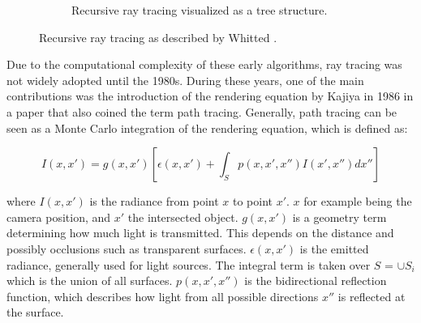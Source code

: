 \begin{figure}[H]
\begin{subfigure}[t]{0.45\textwidth}
    \caption{Recursive ray tracing visualized as a tree structure.}
    \label{fig:recursiveTree}
  \end{subfigure}
  \caption{Recursive ray tracing as described by Whitted \cite{whittedGlobalIllumination}.}
  \label{fig:recursiveRayTracing}
\end{figure}

Due to the computational complexity of these early algorithms, ray tracing was not widely adopted until the 1980s. During these years, one of the main contributions was the introduction of the rendering equation by Kajiya in 1986 in a paper that also coined the term path tracing. Generally, path tracing can be seen as a Monte Carlo integration of the rendering equation, which is defined as:

\begin{equation}
  \label{eqn:rendering-equation}
  I(x, x') = g(x, x') [\epsilon(x, x') + \int_{S} p(x, x', x'')I(x', x'')dx'']
\end{equation}

where $I(x, x')$ is the radiance from point $x$ to point $x'$. $x$ for example being the camera position, and $x'$ the intersected object. $g(x, x')$ is a geometry term determining how much light is transmitted. This depends on the distance and possibly occlusions such as transparent surfaces. $\epsilon(x, x')$ is the emitted radiance, generally used for light sources. The integral term is taken over $S$ = $\cup S_i$ which is the union of all surfaces. $p(x, x', x'')$ is the bidirectional reflection function, which describes how light from all possible directions $x''$ is reflected at the surface. \cite{kajiya1986rendering}


